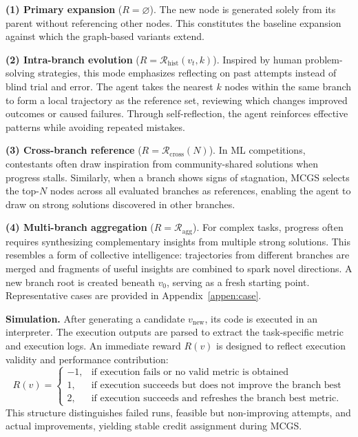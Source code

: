 \textbf{(1) Primary expansion} ($R = \varnothing$).
The new node is generated solely from its parent without referencing other nodes. This constitutes the baseline expansion against which the graph-based variants extend.

\textbf{(2) Intra-branch evolution} ($R = \mathcal{R}_{\text{hist}}(v_t, k)$).
Inspired by human problem-solving strategies, this mode emphasizes reflecting on past attempts instead of blind trial and error. The agent takes the nearest $k$ nodes within the same branch to form a local trajectory as the reference set, reviewing which changes improved outcomes or caused failures. Through self-reflection, the agent reinforces effective patterns while avoiding repeated mistakes.

\textbf{(3) Cross-branch reference} ($R = \mathcal{R}_{\text{cross}}(N)$).
In ML competitions, contestants often draw inspiration from community-shared solutions when progress stalls. Similarly, when a branch shows signs of stagnation, MCGS selects the top-$N$ nodes across all evaluated branches as references, enabling the agent to draw on strong solutions discovered in other branches.

\textbf{(4) Multi-branch aggregation} ($R = \mathcal{R}_{\text{agg}}$).
For complex tasks, progress often requires synthesizing complementary insights from multiple strong solutions. This resembles a form of collective intelligence: trajectories from different branches are merged and fragments of useful insights are combined to spark novel directions. A new branch root is created beneath $v_0$, serving as a fresh starting point. Representative cases are provided in Appendix~\ref{appen:case}.


\textbf{Simulation.}
After generating a candidate $v_{\text{new}}$, its code is executed in an interpreter. The execution outputs are parsed to extract the task-specific metric and execution logs. An immediate reward $R(v)$ is designed to reflect execution validity and performance contribution:
\begin{equation}
\label{eq:reward}
R(v) =
\begin{cases}
-1, & \text{if execution fails or no valid metric is obtained} \\
1,  & \text{if execution succeeds but does not improve the branch best} \\
2,  & \text{if execution succeeds and refreshes the branch best metric}.
\end{cases}
\end{equation}
This structure distinguishes failed runs, feasible but non-improving attempts, and actual improvements, yielding stable credit assignment during MCGS.



